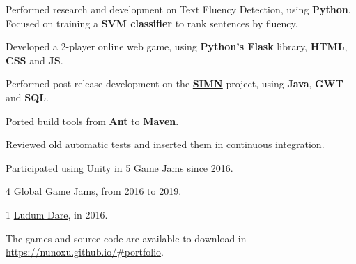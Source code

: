 \documentclass[a4paper]{deedy-resume} %
\begin{document}
\begin{minipage}[t]{0.64\textwidth}
\sectionspace %


\begin{tightitemize}
    \item Performed research and development on Text Fluency Detection, using \textbf{Python}. Focused on training a \textbf{SVM classifier} to rank sentences by fluency.
    \item Developed a 2-player online web game, using \textbf{Python’s Flask} library, \textbf{HTML}, \textbf{CSS} and \textbf{JS}.
\end{tightitemize}

\sectionspace %



\begin{tightitemize}
    \item Performed post-release development on the \textbf{\href{http://www.opensoft.pt/simn/}{SIMN}} project, using \textbf{Java}, \textbf{GWT} and \textbf{SQL}.
    \item Ported build tools from \textbf{Ant} to \textbf{Maven}.
    \item Reviewed old automatic tests and inserted them in continuous integration.
\end{tightitemize}

\sectionspace %



\href{https://nunoxu.github.io/#portfolio}{}

\begin{tightitemize}
    \item Participated using Unity in 5 Game Jams since 2016.
    \item 4 \href{https://globalgamejam.org/}{Global Game Jams}, from 2016 to 2019.
    \item 1 \href{https://ldjam.com/}{Ludum Dare}, in 2016.
    \item The games and source code are available to download in \href{https://nunoxu.github.io/#portfolio}{https://nunoxu.github.io/\#portfolio}.
\end{tightitemize}


\end{minipage}
\end{document}
